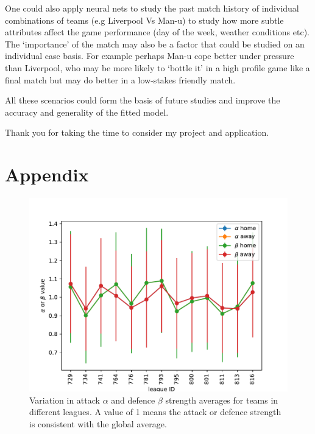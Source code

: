 \documentclass[10pt]{article}
\begin{document}
One could also apply neural nets to study the past match history of individual combinations of teams (e.g Liverpool Vs Man-u) to study how more subtle attributes affect the game performance (day of the week, weather conditions etc). The `importance' of the match may also be a factor that could be studied on an individual case basis. For example perhaps Man-u cope better under pressure than Liverpool, who may be more likely to `bottle it' in a high profile game like a final match but may do better in a low-stakes friendly match.  

All these scenarios could form the basis of future studies and improve the accuracy and generality of the fitted model.

Thank you for taking the time to consider my project and application.






\section{Appendix}

\begin{figure}[h]
\begin{center}
\includegraphics[scale=1.0,angle=0,trim=0cm 0cm 0cm 0cm]{fig_alpha_beta_league_ave.pdf}
\caption{Variation in attack $\alpha$ and defence $\beta$ strength averages for teams in different leagues. A value of 1 means the attack or defence strength is consistent with the global average.}
\label{fig_league_ave}
\end{center}
\end{figure} 
\end{document}

